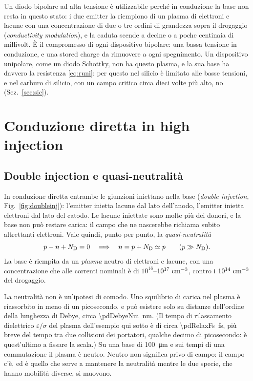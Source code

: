 \documentclass[10pt,a4paper]{scrartcl}
\let\newcommand\pdvaluedefine
\newcommand{\ND}{N_\mathrm{D}}
\newcommand{\Pp}{p\textsuperscript{+}}
\newcommand{\Np}{n\textsuperscript{+}}
\newcommand{\cmc}{\si{\centi\metre^{-3}}}
\begin{document}
Un diodo bipolare ad alta tensione è utilizzabile perché in conduzione la base non resta in questo stato: i due emitter la riempiono di un plasma di elettroni e lacune con una concentrazione di due o tre ordini di grandezza sopra il drogaggio (\emph{conductivity modulation}), e la caduta scende a decine o a poche centinaia di millivolt. È il compromesso di ogni dispositivo bipolare: una bassa tensione in conduzione, e una stored charge da rimuovere a ogni spegnimento. Un dispositivo unipolare, come un diodo Schottky, non ha questo plasma, e la sua base ha davvero la resistenza \eqref{eq:runi}: per questo nel silicio è limitato alle basse tensioni, e nel carburo di silicio, con un campo critico circa dieci volte più alto, no (Sez.~\ref{sec:sic}).
\section{Conduzione diretta in high injection}
\label{sec:conduction}
\subsection{Double injection e quasi-neutralità}
\label{sec:doubleinj}
In conduzione diretta entrambe le giunzioni iniettano nella base (\emph{double injection}, Fig.~\ref{fig:doubleinj}): l'emitter \Pp{} inietta lacune dal lato dell'anodo, l'emitter \Np{} inietta elettroni dal lato del catodo. Le lacune iniettate sono molte più dei donori, e la base non può restare carica: il campo che ne nascerebbe richiama subito altrettanti elettroni. Vale quindi, punto per punto, la \emph{quasi-neutralità}
\begin{equation}
p - n + \ND = 0 \quad\Longrightarrow\quad n = p + \ND \simeq p \qquad (p \gg \ND) .
\label{eq:neutrality}
\end{equation}
La base è riempita da un \emph{plasma} neutro di elettroni e lacune, con una concentrazione che alle correnti nominali è di $10^{16}$--$10^{17}\ \cmc$, contro i $10^{14}\ \cmc$ del drogaggio.

La neutralità non è un'ipotesi di comodo. Uno squilibrio di carica nel plasma è riassorbito in meno di un picosecondo, e può esistere solo su distanze dell'ordine della lunghezza di Debye, circa \SI{\pdDebyeNm}{\nano\metre}. (Il tempo di rilassamento dielettrico $\varepsilon/\sigma$ del plasma dell'esempio qui sotto è di circa \SI{\pdRelaxFs}{\femto\second}, più breve del tempo tra due collisioni dei portatori, qualche decimo di picosecondo: è quest'ultimo a fissare la scala.) Su una base di \SI{100}{\micro\metre} e sui tempi di una commutazione il plasma è neutro. Neutro non significa privo di campo: il campo c'è, ed è quello che serve a mantenere la neutralità mentre le due specie, che hanno mobilità diverse, si muovono.
\end{document}
